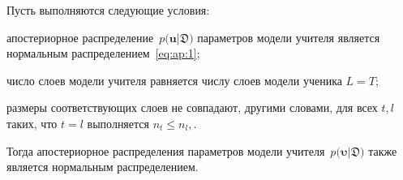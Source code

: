 \documentclass[12pt]{a&t}
\begin{document}
\begin{theorem}
\label{theorem:ap:neural}
Пусть выполняются следующие условия:
\begin{enumlist}
\item апостериорное распределение~$p\bigr(\mathbf{u}|\mathfrak{D}\bigr)$ параметров модели учителя является нормальным распределением~\eqref{eq:ap:1};
\item число слоев модели учителя равняется числу слоев модели ученика $L=T$;
\item размеры соответствующих слоев не совпадают, другими словами, для всех $t, l$ таких, что $t=l$ выполняется $n_t \leq n_l,$.
\end{enumlist}
Тогда апостериорное распределения параметров модели учителя~$p\bigr(\bm{\upsilon}|\mathfrak{D}\bigr)$ также является нормальным распределением.
\end{theorem}
\end{document}

